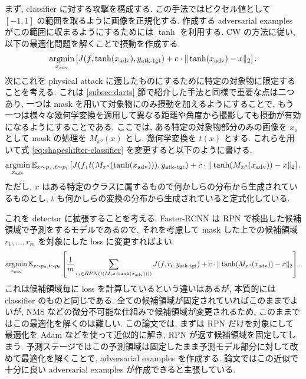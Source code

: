 まず, classifier に対する攻撃を構成する.
この手法ではピクセル値として $[-1, 1]$ の範囲を取るように画像を正規化する.
作成する adversarial examples がこの範囲に収まるようにするためには $\tanh$ を利用する.
CW の方法に従い, 以下の最適化問題を解くことで摂動を作成する.
%
\begin{eqnarray}
\mathop{\rm argmin}\limits_{x_{\text{adv}}} \left[ J (f, \tanh (x_{\text{adv}}), y_{\text{atk-tgt}}) + c \cdot \| \tanh (x_{\text{adv}}) - x \|_2 \right].
\label{eq:shapeshifter-classifier}
\end{eqnarray}
%
次にこれを physical attack に適したものにするために特定の対象物に限定することを考える.
これは \ref{subsec:darts} 節で紹介した手法と同様で重要な点は二つあり, 一つは mask を用いて対象物にのみ摂動を加えるようにすることで, もう一つは様々な幾何学変換を適用して異なる距離や角度から撮影しても摂動が有効になるようにすることである.
ここでは, ある特定の対象物部分のみの画像を $x_o$ として mask の処理を $M_{x^o} (x)$ とし,  幾何学変換を $t(x)$ とする.
これらを用いて式 \ref{eq:shapeshifter-classifier} を変更すると以下のように書ける.
%
\begin{eqnarray}
\mathop{\rm argmin}\limits_{x_{\text{adv}}} \mathbb{E}_{x \sim p_x, t \sim p_t} \left[ J (f, t(M_{x^o} (\tanh (x_{\text{adv}}))), y_{\text{atk-tgt}}) + c \cdot \| \tanh (M_{x^o} (x_{\text{adv}})) - x \|_2 \right].
\label{eq:shapeshifter-classifier-object-oriented}
\end{eqnarray}
%
ただし, $x$ はある特定のクラスに属するもので何かしらの分布から生成されているものとし, $t$ も何かしらの変換の分布から生成されていると定式化している.

これを detector に拡張することを考える.
Faster-RCNN は RPN で検出した候補領域で予測をするモデルであるので, それを考慮して mask した上での候補領域 $r_1, \dots, r_m$ を対象にした loss に変更すればよい.
%
\begin{eqnarray}
\mathop{\rm argmin}\limits_{x_{\text{adv}}} \mathbb{E}_{x \sim p_x, t \sim p_t} \left[ \frac{1}{m} \sum_{r_i \in RPN (t(M_{x^o} (\tanh (x_{\text{adv}}))))} J (f, r_i, y_{\text{atk-tgt}}) + c \cdot \| \tanh (M_{x^o} (x_{\text{adv}})) - x \|_2 \right].
\label{eq:shapeshifter-detector}
\end{eqnarray}
%
これは候補領域毎に loss を計算しているという違いはあるが, 本質的には classifier のものと同じである.
全ての候補領域が固定されていればこのままでよいが, NMS などの微分不可能な仕組みで候補領域が変更されるため, このままではこの最適化を解くのは難しい.
この論文では, まずは RPN だけを対象にして最適化を Adam などを使って近似的に解き, RPN が返す候補領域を固定してしまう.
予測ステージではこの予測領域は固定したまま予測モデル部分に対して改めて最適化を解くことで, adversarial examples を作成する.
論文ではこの近似で十分に良い adversarial examples が作成できると主張している.

